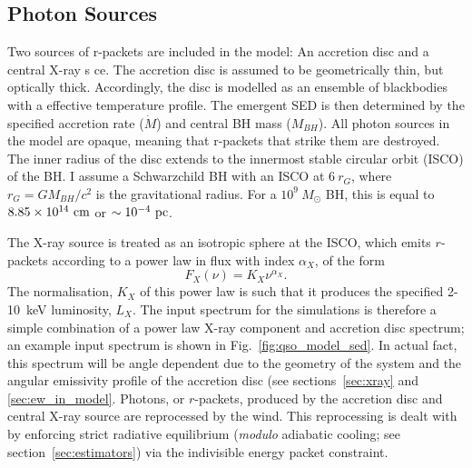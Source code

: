 \subsection{Photon Sources}
\label{sec:photon_sources}

Two sources of r-packets are included in the model:
An accretion disc and a central X-ray s ce.
The accretion disc is assumed to be geometrically thin, 
but optically thick.
Accordingly, the disc is modelled as an ensemble of blackbodies with a 
\cite{shakurasunyaev1973} effective temperature profile. 
The emergent SED is then determined by the specified accretion rate ($\dot{M}$)
and central BH mass ($M_{BH}$).
All photon sources in the model are opaque, meaning
that r-packets that strike them are destroyed.
The inner radius of the disc extends to the innermost 
stable circular orbit (ISCO) of the BH. 
I assume a Schwarzchild BH with an ISCO at $6~r_G$, where 
$r_G = GM_{BH}/c^2$ is the gravitational radius.
For a $10^9~M_\odot$ BH, this is equal to $8.85\times10^{14}~{\rm cm}$ 
or $\sim10^{-4}~{\rm pc}$.  


The X-ray source is treated as an isotropic sphere at the ISCO,
which emits $r$-packets according to a power law in flux with index $\alpha_X$, of the form
\begin{equation}
F_X (\nu) = K_X \nu^{\alpha_X}.
\end{equation}
The normalisation, $K_X$ of this power law is such that it 
produces the specified 2-10~keV luminosity, $L_X$.
The input spectrum for the simulations is therefore a simple combination
of a power law X-ray component and accretion disc spectrum; an example input
spectrum is shown in Fig.~\ref{fig:qso_model_sed}. In actual fact, this
spectrum will be angle dependent due to the geometry of the system and 
the angular emissivity profile of the accretion disc (see sections~\ref{sec:xray}
and \ref{sec:ew_in_model}.
Photons, or $r$-packets, produced by the accretion disc and central X-ray source
are reprocessed by the wind. This reprocessing is dealt with by enforcing strict
radiative equilibrium ({\em modulo} adiabatic cooling; see section~\ref{sec:estimators})
via the indivisible energy packet constraint.  


